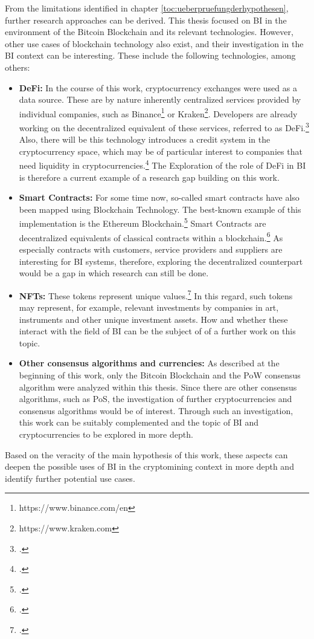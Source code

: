 From the limitations identified in chapter \ref{toc:ueberpruefungderhypothesen}, further
research approaches can be derived. This thesis focused on \ac{BI} in the environment of the Bitcoin Blockchain and its
relevant technologies. However, other use cases of blockchain technology also exist, and their investigation in the
\ac{BI} context can be interesting. These include the following technologies, among others:

\begin{itemize}
    \item \textbf{\ac{DeFi}: }In the course of this work, cryptocurrency exchanges were used as a data source. These are by nature
    inherently centralized services provided by individual companies, such as Binance\footnote{https://www.binance.com/en}
    or Kraken\footnote{https://www.kraken.com}. Developers are already working on the decentralized equivalent of these
    services, referred to as \ac{DeFi}.\footcite[Cf.][]{wiesflecker2021trends} Also, there will be
    this technology introduces a credit system in the cryptocurrency space, which may be of particular interest to companies
    that need liquidity in cryptocurrencies.\footcite[Cf.][]{wiesflecker2021trends} The
    Exploration of the role of \ac{DeFi} in \ac{BI} is therefore a current example of a research gap building on this work.
    \item \textbf{Smart Contracts: }For some time now, so-called smart contracts have also been mapped using Blockchain
    Technology. The best-known example of this implementation is the Ethereum
    Blockchain.\footcite[Cf.][]{wiesflecker2021trends} Smart Contracts are decentralized equivalents of classical contracts
    within a blockchain.\footcite[Cf.][]{wiesflecker2021trends} As especially contracts with customers, service providers
    and suppliers are interesting for \ac{BI} systems, therefore, exploring the decentralized counterpart would be a
    gap in which research can still be done.
    \item \textbf{\acp{NFT}: }These tokens represent unique values.\footcite[Cf.][]{wiesflecker2021trends} 
    In this regard, such tokens may represent, for example, relevant investments by companies in art, instruments
    and other unique investment assets. How and whether these interact with the field of \ac{BI} can be the subject of
    of a further work on this topic. 
    \item \textbf{Other consensus algorithms and currencies: }As described at the beginning of this work, only the Bitcoin
    Blockchain and the \ac{PoW} consensus algorithm were analyzed within this thesis. Since there are other consensus algorithms,
    such as \ac{PoS}, the investigation of further cryptocurrencies and consensus algorithms would be of
    interest. Through such an investigation, this work can be suitably complemented and
    the topic of \ac{BI} and cryptocurrencies to be explored in more depth.
\end{itemize}

Based on the veracity of the main hypothesis of this work, these aspects can deepen the possible uses of \ac{BI} in the
cryptomining context in more depth and identify further potential use cases.
